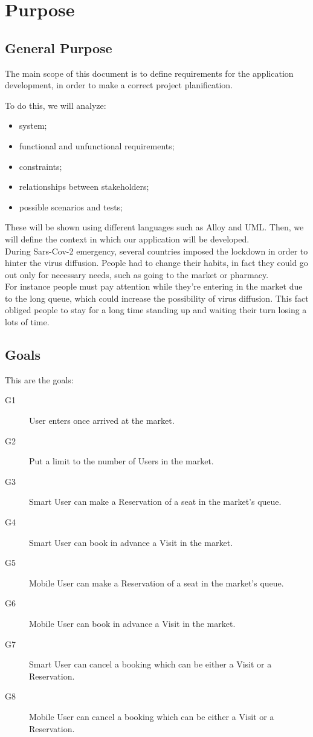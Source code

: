 \section{Purpose}
\subsection{General Purpose}

The main scope of this document is to define requirements for the application development, in order to make a correct project planification.
\par
To do this, we will analyze:

\begin{itemize}
\item system;
\item functional and unfunctional requirements;
\item constraints;
\item relationships between stakeholders;
\item possible scenarios and tests;
\end{itemize}
\bigskip
These will be shown using different languages such as Alloy and UML.
Then, we will define the context in which our application will be developed.\\
During Sars-Cov-2 emergency, several countries imposed the lockdown in order to hinter the virus diffusion.
People had to change their habits, in fact they could go out only for necessary needs, such as going to the market or pharmacy.\\
For instance people must pay attention while they're entering in the market due to the long queue, which could increase the possibility of virus diffusion.
This fact obliged people to stay for a long time standing up and waiting their turn losing a lots of time. 
\pagebreak

\subsection{Goals}

This are the goals:

\begin{description}
    \item[G1]User enters once arrived at the market.
    \item[G2]Put a limit to the number of Users in the market.
    \item[G3]Smart User can make a Reservation of a seat in the market's queue.
    \item[G4]Smart User can book in advance a Visit in the market.
    \item[G5]Mobile User can make a Reservation of a seat in the market's queue.
    \item[G6]Mobile User can book in advance a Visit in the market.
    \item[G7]Smart User can cancel a booking which can be either a Visit or a Reservation.
    \item[G8]Mobile User can cancel a booking which can be either a Visit or a Reservation.
\end{description}


